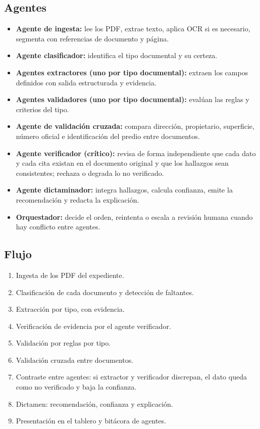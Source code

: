 \documentclass[11pt, a4paper]{article}
\begin{document}
\subsection*{Agentes}
\begin{itemize}
    \item \textbf{Agente de ingesta:} lee los PDF, extrae texto, aplica OCR si es necesario, segmenta con referencias de documento y página.
    \item \textbf{Agente clasificador:} identifica el tipo documental y su certeza.
    \item \textbf{Agentes extractores (uno por tipo documental):} extraen los campos definidos con salida estructurada y evidencia.
    \item \textbf{Agentes validadores (uno por tipo documental):} evalúan las reglas y criterios del tipo.
    \item \textbf{Agente de validación cruzada:} compara dirección, propietario, superficie, número oficial e identificación del predio entre documentos.
    \item \textbf{Agente verificador (crítico):} revisa de forma independiente que cada dato y cada cita existan en el documento original y que los hallazgos sean consistentes; rechaza o degrada lo no verificado.
    \item \textbf{Agente dictaminador:} integra hallazgos, calcula confianza, emite la recomendación y redacta la explicación.
    \item \textbf{Orquestador:} decide el orden, reintenta o escala a revisión humana cuando hay conflicto entre agentes.
\end{itemize}

\subsection*{Flujo}
\begin{enumerate}
    \item Ingesta de los PDF del expediente.
    \item Clasificación de cada documento y detección de faltantes.
    \item Extracción por tipo, con evidencia.
    \item Verificación de evidencia por el agente verificador.
    \item Validación por reglas por tipo.
    \item Validación cruzada entre documentos.
    \item Contraste entre agentes: si extractor y verificador discrepan, el dato queda como no verificado y baja la confianza.
    \item Dictamen: recomendación, confianza y explicación.
    \item Presentación en el tablero y bitácora de agentes.
\end{enumerate}
\end{document}
